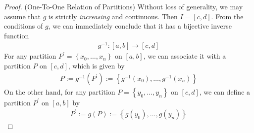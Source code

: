 \documentclass[thmcnt=section, 12pt]{elegantbook}
\begin{document}
\begin{proof}
    (One-To-One Relation of Partitions) Without loss of generality, we may assume that $g$ is strictly \textit{increasing} and continuous. Then $I = [c, d]$. From the conditions of $g$, we can immediately conclude that it has a bijective inverse function
    \begin{align*}
        g^{-1}: [a, b] \to [c, d]
    \end{align*}
    For any partition $P^\prime = \left\{x_0, \ldots, x_n\right\}$ on $[a, b]$, we can associate it with a partition $P$ on $[c, d]$, which is given by 
    \begin{align*}
        P := g^{-1}(P^\prime) 
        := \left\{g^{-1}(x_0), \ldots, g^{-1}(x_n)\right\}
    \end{align*}
    On the other hand, for any partition $P = \left\{y_0, \ldots, y_n\right\}$ on $[c, d]$, we can define a partition $P^\prime$ on $[a, b]$ by 
    \begin{align*}
        P^\prime := g(P) := \left\{g(y_0), \ldots, g(y_n)\right\}
    \end{align*}


\end{proof}
\end{document}
